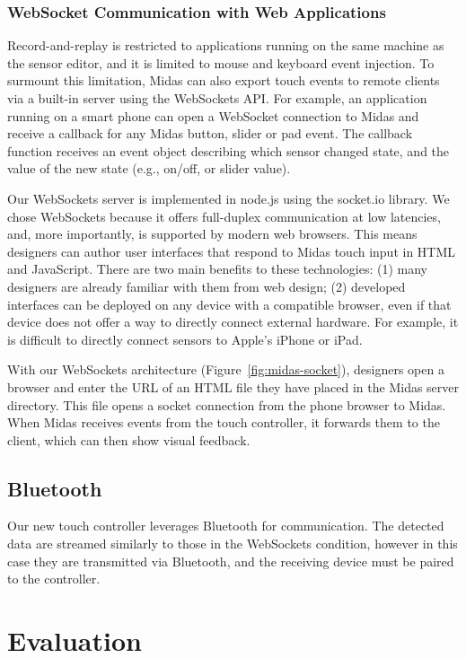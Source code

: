 \subsubsection{WebSocket Communication with Web Applications}

Record-and-replay is restricted to applications running on the same machine as the sensor editor, and it is limited to mouse and keyboard event injection. To surmount this limitation, Midas can also export touch events to remote clients via a built-in server using the WebSockets API. For example, an application running on a smart phone can open a WebSocket connection to Midas and receive a callback for any Midas button, slider or pad event. The callback function receives an event object describing which sensor changed state, and the value of the new state (e.g., on/off, or slider value).

Our WebSockets server is implemented in node.js using the socket.io library. We chose WebSockets because it offers full-duplex communication at low latencies, and, more importantly, is supported by modern web browsers. This means designers can author user interfaces that respond to Midas touch input in HTML and JavaScript. There are two main benefits to these technologies: (1) many designers are already familiar with them from web design; (2) developed interfaces can be deployed on any device with a compatible browser, even if that device does not offer a way to directly connect external hardware. For example, it is difficult to directly connect sensors to Apple's iPhone or iPad.

With our WebSockets architecture (Figure~\ref{fig:midas-socket}), designers open a browser and enter the URL of an HTML file they have placed in the Midas server directory. This file opens a socket connection from the phone browser to Midas. When Midas receives events from the touch controller, it forwards them to the client, which can then show visual feedback.

\subsection{Bluetooth}

Our new touch controller leverages Bluetooth for communication. The detected data are streamed similarly to those in the WebSockets condition, however in this case they are transmitted via Bluetooth, and the receiving device must be paired to the controller.

\section{Evaluation}

